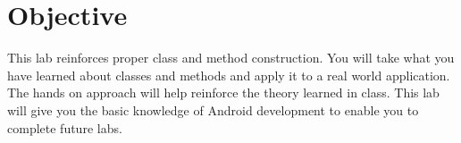 \section{Objective}

This lab reinforces proper class and method construction. 
You will take what you have learned about classes and methods and apply it to a real world application. 
The hands on approach will help reinforce the theory learned in class.
This lab will give you the basic knowledge of Android development to enable you to complete future labs.